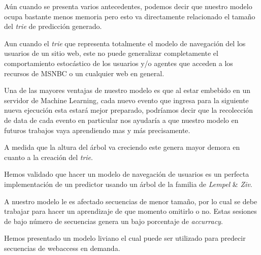 Aún cuando se presenta varios antecedentes, podemos decir que nuestro modelo ocupa bastante menos memoria pero esto va directamente relacionado el tamaño del \emph{trie} de predicción generado.

%
Aun cuando el \emph{trie} que representa totalmente el modelo de navegación del los usuarios de un sitio web, este no puede generalizar completamente el comportamiento estocástico de los usuarios y/o agentes que acceden a los recursos de MSNBC o un cualquier web en general.

Una de las mayores ventajas de nuestro modelo es que al estar embebido en un servidor de Machine Learning, cada nuevo evento que ingresa para la siguiente nueva ejecución esta estará mejor preparado, podríamos decir que la recolección de data de cada evento en particular nos ayudaría a que nuestro modelo en futuros trabajos vaya aprendiendo mas y más precisamente.


A medida que la altura del árbol va creciendo este genera mayor demora en cuanto a la creación del \emph{trie}.

Hemos validado que hacer un modelo de navegación de usuarios es un perfecta implementación de un predictor usando un árbol de la familia de \emph{Lempel} \& \emph{Ziv}.

A nuestro modelo le es afectado secuencias de menor tamaño, por lo cual se debe trabajar para hacer un aprendizaje de que momento omitirlo o no. Estas sesiones de bajo número de secuencias genera un bajo porcentaje de \emph{accurracy}. 



Hemos presentado un modelo liviano el cual puede ser utilizado para predecir secuencias de webaccess en demanda.










